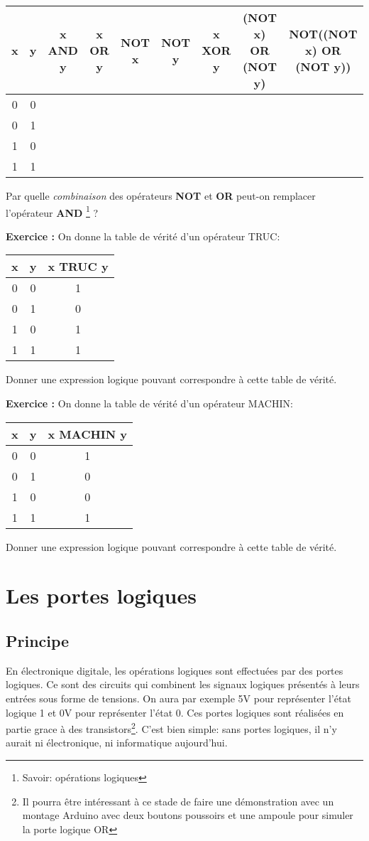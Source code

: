 \documentclass{article}
\newcounter{exo}
\newcommand{\exercice}{
\stepcounter{exo}
\noindent\textbf{Exercice \theexo :}
}
\begin{document}
\begin{tabular}{|c|c|c|c|c|c|c|c|c|}\hline
x & y & x AND y & x OR y & NOT x & NOT y & x XOR y & (NOT x) OR (NOT y) & NOT((NOT x) OR (NOT y))\\\hline
0 & 0 &        &        &       &       & &                   &                         \\\hline
0 & 1 &        &        &       &       &  &                  &                         \\\hline
1 & 0 &        &        &       &       &   &                 &                         \\\hline
1 & 1 &        &        &       &       &   &                 &                         \\\hline
\end{tabular}\newline
Par quelle \emph{combinaison} des opérateurs \textbf{NOT} et \textbf{OR} peut-on remplacer l'opérateur \textbf{AND} \footnote{Savoir: opérations logiques} ?

\exercice On donne la table de vérité d'un opérateur TRUC: \begin{tabular}{|c|c|c|}\hline
x & y & x TRUC y\\\hline
0 & 0 & 1 \\\hline
0 & 1 & 0 \\\hline
1 & 0 & 1 \\\hline
1 & 1 & 1 \\\hline
\end{tabular}

Donner une expression logique pouvant correspondre à cette table de vérité.

\exercice On donne la table de vérité d'un opérateur MACHIN: \begin{tabular}{|c|c|c|}\hline
x & y & x MACHIN y\\\hline
0 & 0 & 1 \\\hline
0 & 1 & 0 \\\hline
1 & 0 & 0 \\\hline
1 & 1 & 1 \\\hline
\end{tabular}

Donner une expression logique pouvant correspondre à cette table de vérité.
\section{Les portes logiques}
\subsection{Principe}
 En électronique digitale, les opérations logiques sont effectuées par des portes logiques. Ce sont des circuits qui combinent les signaux logiques présentés à leurs entrées sous forme de tensions. On aura par exemple 5V pour représenter l’état logique 1 et 0V pour représenter l’état 0. Ces portes logiques sont réalisées en partie grace à des transistors\footnote{Il pourra être intéressant à ce stade de faire une démonstration avec un montage Arduino avec deux boutons poussoirs et une ampoule pour simuler la porte logique OR}. C'est bien simple: sans portes logiques, il n'y aurait ni électronique, ni informatique aujourd'hui.
\end{document}
